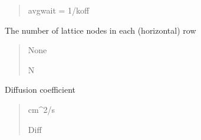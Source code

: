 \documentclass[letterpaper,10pt,english]{sphinxmanual}
\begin{document}
\begin{fulllineitems}
\begin{fulllineitems}
\begin{quote}
\begin{description}
\sphinxAtStartPar
avgwait = 1/koff

\end{description}\end{quote}

\end{fulllineitems}


\begin{fulllineitems}
\label{\detokenize{lysis.util:lysis.util.parameters.MacroParameters.cols}}
\pysigstartsignatures
{}
\pysigstopsignatures
\sphinxAtStartPar
The number of lattice nodes in each (horizontal) row
\begin{quote}\begin{description}
\sphinxAtStartPar
None

\sphinxAtStartPar
N

\end{description}\end{quote}

\end{fulllineitems}


\begin{fulllineitems}
\label{\detokenize{lysis.util:lysis.util.parameters.MacroParameters.diffusion_coeff}}
\pysigstartsignatures
{}
\pysigstopsignatures
\sphinxAtStartPar
Diffusion coefficient
\begin{quote}\begin{description}
\sphinxAtStartPar
cm\textasciicircum{}2/s

\sphinxAtStartPar
Diff

\end{description}\end{quote}


\end{fulllineitems}
\end{fulllineitems}
\end{document}
